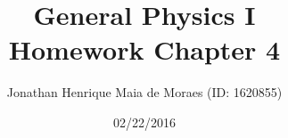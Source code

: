 \title{General Physics I \\ Homework Chapter 4}
\author{Jonathan Henrique Maia de Moraes (ID: 1620855)}
\date{02/22/2016}
\maketitle

